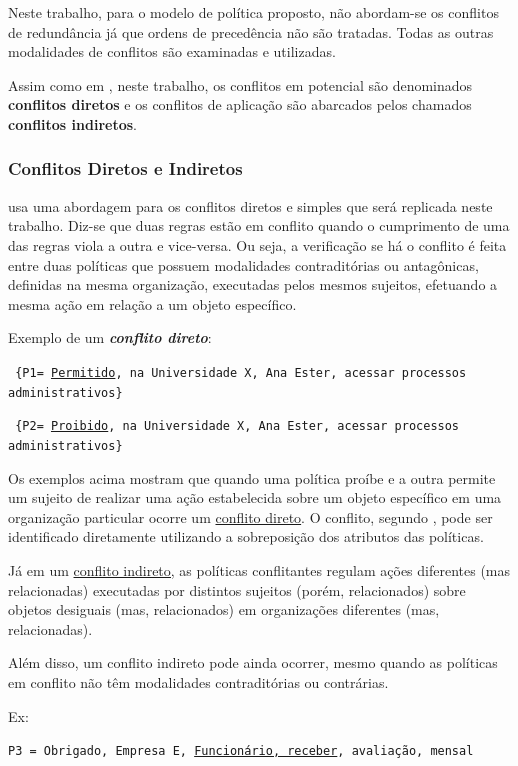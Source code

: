 Neste trabalho, para o modelo de política proposto, não abordam-se os conflitos de redundância já que ordens de precedência não são tratadas. Todas as outras modalidades de conflitos são examinadas e utilizadas.

Assim como em \cite[p. 24]{sarkis2017}, neste trabalho, os conflitos em potencial são denominados \textbf{conflitos diretos} e os conflitos de aplicação são abarcados pelos chamados \textbf{conflitos indiretos}.

\subsubsection{Conflitos Diretos e Indiretos}
 usa uma abordagem para os conflitos diretos e simples que será replicada neste trabalho. Diz-se que duas regras estão em conflito quando o cumprimento de uma das regras viola a outra e vice-versa. Ou seja, a verificação se há o conflito é feita entre duas políticas que possuem modalidades contraditórias ou antagônicas, definidas na mesma organização, executadas pelos mesmos sujeitos, efetuando a mesma ação em relação a um objeto específico.

Exemplo de um \textit{\textbf{conflito direto}}:

{\scriptsize \texttt{ \{P1= {\underline{Permitido}, na Universidade X, Ana Ester, acessar processos administrativos\} }}}

{\scriptsize \texttt{ \{P2= {\underline{Proibido}, na Universidade X, Ana Ester, acessar processos administrativos\} }}}

Os exemplos acima mostram que quando uma política proíbe e a outra permite um sujeito de realizar uma ação estabelecida sobre um objeto específico em uma organização particular ocorre um \underline{conflito direto}. O conflito, segundo , pode ser identificado diretamente utilizando a sobreposição dos atributos das políticas.

Já em um \underline{conflito indireto,} as políticas conflitantes regulam ações diferentes (mas relacionadas) executadas por distintos sujeitos (porém, relacionados) sobre objetos desiguais (mas, relacionados) em organizações diferentes (mas, relacionadas). \cite[p.24]{sarkis2017}

Além disso, um conflito indireto pode ainda ocorrer, mesmo quando as políticas em conflito não têm modalidades contraditórias ou contrárias.

Ex:

{\scriptsize \texttt{P3 = {Obrigado, Empresa E, \underline{Funcionário, receber}, avaliação, mensal}}}

